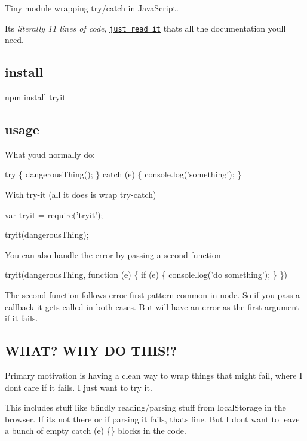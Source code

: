 Tiny module wrapping try/catch in Java\+Script.

It\textquotesingle{}s {\itshape literally 11 lines of code}, \href{tryit.js}{\tt just read it} that\textquotesingle{}s all the documentation you\textquotesingle{}ll need.

\subsection*{install}


\begin{DoxyCode}
npm install tryit
\end{DoxyCode}


\subsection*{usage}

What you\textquotesingle{}d normally do\+: 
\begin{DoxyCode}
try \{
    dangerousThing();
\} catch (e) \{
    console.log('something');
\}
\end{DoxyCode}


With try-\/it (all it does is wrap try-\/catch) 
\begin{DoxyCode}
var tryit = require('tryit');

tryit(dangerousThing);
\end{DoxyCode}


You can also handle the error by passing a second function 
\begin{DoxyCode}
tryit(dangerousThing, function (e) \{
    if (e) \{
        console.log('do something');
    \}
\})
\end{DoxyCode}


The second function follows error-\/first pattern common in node. So if you pass a callback it gets called in both cases. But will have an error as the first argument if it fails.

\subsection*{W\+H\+AT? W\+HY DO T\+H\+I\+S!?}

Primary motivation is having a clean way to wrap things that might fail, where I don\textquotesingle{}t care if it fails. I just want to try it.

This includes stuff like blindly reading/parsing stuff from local\+Storage in the browser. If it\textquotesingle{}s not there or if parsing it fails, that\textquotesingle{}s fine. But I don\textquotesingle{}t want to leave a bunch of empty {\ttfamily catch (e) \{\}} blocks in the code.

